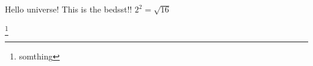 \documentclass{article}
\begin{document}
Hello universe! This is the bedsst!!
$2^2 = \sqrt{16}$

\footnote{somthing}
\end{document}
